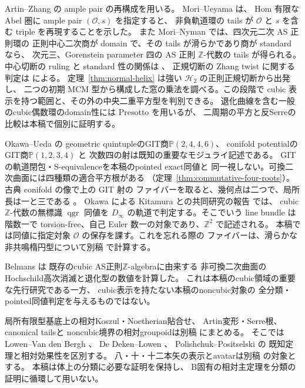 \documentclass[a4paper,11pt]{ltjsarticle}
\numberwithin{equation}{section}
\theoremstyle{plain}
\theoremstyle{definition}
\theoremstyle{remark}
\newcommand{\OO}{\mathcal O}
\newcommand{\PP}{\mathbb P}
\newcommand{\HH}{\mathcal H_2}
\begin{document}
Artin--Zhang \cite{AZ1994} の ample pair の再構成を用いる。
Mori--Ueyama \cite[Definition 2.5, Theorem 2.6(2)]{MU2021} は、
Hom 有限な Abel 圏に ample pair $(\OO,s)$ を指定すると、
非負軌道環の tails が $\OO$ と $s$ を含む triple を再現することを示した。
また Mori--Nyman \cite[Theorem 6.13]{MN2025} では、四次元二次 AS 正則環の
正則中心二次商が domain で、その tails が滑らかであり商が standard なら、
次元三、Gorenstein parameter 四の AS 正則 $\mathbb Z$-代数の tails が得られる。
中心切断の ruling と standard 性の関係は \cite{SVdB2013,MU2021}、
正規切断の Zhang twist に関する判定は \cite{MUW2026} による。
定理~\ref{thm:normal-helix} は強い $\HH$ の正則正規切断から出発し、
二つの初期 MCM 型から構成した窓の乗法を調べる。この段階で
cubic 表示を持つ範囲と、その外の中央二重平方型を判別できる。
退化曲線を含む一般のcubic偶数環のdomain性には
Presotto \cite[Theorem 2.8; Appendix A]{Presotto2018} を用いるが、
二周期の平方と反Serreの比較は本稿で個別に証明する。

Okawa--Ueda \cite[Theorem 1.1]{OU2014} の
geometric quintupleのGIT商$\PP(2,4,4,6)$、
conifold potentialのGIT商$\PP(1,2,3,4)$ と
次数四の射は既知の重要なモジュライ記述である。
GITの軌道閉包・S-equivalenceを本稿のpointed exact同値と
同一視しない。可換二次曲面には四種類の適合平方根がある
（定理~\ref{thm:commutative-four-roots}）。古典 conifold の像で上の GIT 射の
ファイバーを取ると、幾何点は二つで、局所長は一と三である
\cite[\texttt{cor:qa-ou-classical-scheme-fiber}]{QuiverAvatarModuli2026}。
Okawa による Kitamura との共同研究の報告
\cite[Definition 2, Theorems 1, 3]{OkawaKitamura2022OWR} では、
cubic $\mathbb Z$-代数の無標識 $\operatorname{qgr}$ 同値を
$D_\infty$ の軌道で判定する。そこでいう line bundle は階数一で
torsion-free、自己 Euler 数一の対象であり、$\mathbb Z^2$ で記述される。
本稿では同値に指定対象 $\OO$ の保存を課す。これを忘れる際の
ファイバーは、滑らかな非共鳴楕円型について別稿 \cite{QuadricModuli2026}
で計算する。

Belmans \cite[Proposition 31, Corollary 32, Table 2]{Belmans2019} は
既存のcubic AS正則$\mathbb Z$-algebraに由来する
非可換二次曲面のHochschild高次消滅と退化型の数値を計算した。
これは本稿のcubic領域の重要な先行研究である一方、
cubic表示を持たない本稿のnoncubic対象の
全分類・pointed同値判定を与えるものではない。

局所有限型基底上の相対Koszul・Noetherian貼合せ、
Artin変形・Serre根、canonical tailsと
noncubic境界の相対groupoidは別稿
\cite{QuadricModuli2026} にまとめる。
そこではLowen--Van den Bergh \cite{LowenVanDenBergh2006}、
De Deken--Lowen \cite{DeDekenLowen2011}、
Polishchuk--Positselski \cite{PolishchukPositselski2005}の
既知定理と相対効果性を区別する。
八・十・十二本矢の表示とavatarは別稿
\cite{QuiverAvatarModuli2026} の対象とする。
本稿は体上の分類に必要な証明を保持し、
B固有の相対主定理を分類の証明に循環して用いない。
\end{document}
